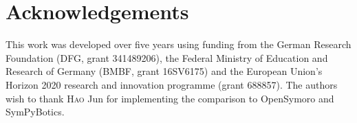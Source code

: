 \documentclass[runningheads]{llncs}
\begin{document}
\section*{Acknowledgements}

This work was developed over five years using funding from the German Research Foundation (DFG, grant 341489206), the Federal Ministry of Education and Research of Germany (BMBF, grant 16SV6175) and the European Union's Horizon 2020 research and innovation programme (grant 688857).
The authors wish to thank \textsc{Hao} Jun for implementing the comparison to OpenSymoro and SymPyBotics.



\end{document}
